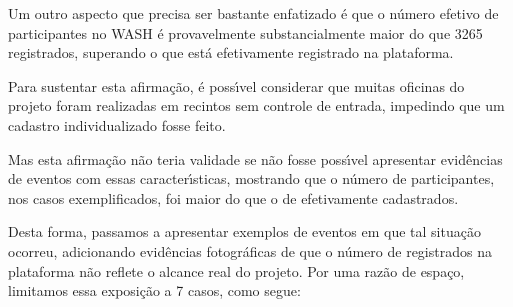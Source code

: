 \documentclass[
12pt,		%
openright,	%
twoside,  %
a4paper,			%
chapter=TITLE,		%
english,			%
french,				%
spanish,			%
brazil				%
]{USPSC-classe/USPSC}
\begin{document}
Um outro aspecto que precisa ser bastante enfatizado \'e que o n\'umero efetivo de participantes no WASH \'e provavelmente substancialmente maior do que 3265 registrados, superando o que est\'a efetivamente registrado na plataforma.


Para sustentar esta afirma\c{c}\~ao, \'e poss\'{\i}vel considerar que muitas oficinas do projeto foram realizadas em recintos sem controle de entrada, impedindo que um cadastro individualizado fosse feito.


Mas esta afirma\c{c}\~ao n\~ao teria validade se n\~ao fosse poss\'{\i}vel apresentar evid\^encias de eventos com essas caracter\'{\i}sticas, mostrando que o n\'umero de participantes, nos casos exemplificados, foi maior do que o de efetivamente cadastrados.


Desta forma, passamos a apresentar exemplos de eventos em que tal situa\c{c}\~ao ocorreu, adicionando evid\^encias fotogr\'aficas de que o n\'umero de registrados na plataforma n\~ao reflete o alcance real do projeto. Por uma raz\~ao de espa\c{c}o, limitamos essa exposi\c{c}\~ao a 7 casos, como segue:
\end{document}
